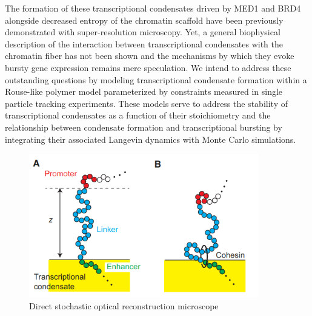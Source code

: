 \documentclass{article}
\begin{document}
The formation of these transcriptional condensates driven by MED1 and BRD4 alongside decreased entropy of the chromatin scaffold have been previously demonstrated with super-resolution microscopy. Yet, a general biophysical description of the interaction between transcriptional condensates with the chromatin fiber has not been shown and the mechanisms by which they evoke bursty gene expression remains mere speculation. We intend to address these outstanding questions by modeling transcriptional condensate formation within a Rouse-like polymer model parameterized by constraints measured in single particle tracking experiments. These models serve to address the stability of transcriptional condensates as a function of their stoichiometry and the relationship between condensate formation and transcriptional bursting by integrating their associated Langevin dynamics with Monte Carlo simulations. 

\clearpage
\begin{figure}
\centering
\includegraphics[width=10cm]{Model.png}
\caption{Direct stochastic optical reconstruction microscope}
\end{figure}





 
\end{document}
